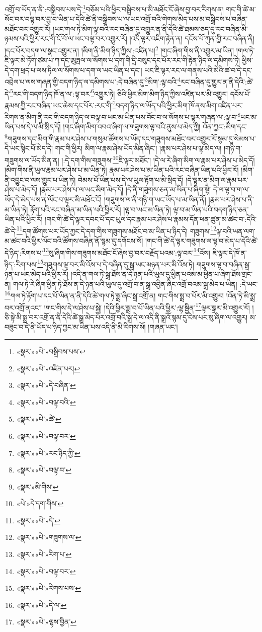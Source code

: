 འགྲོ་བ་ཡོད་ན་ནི་:བསྒྲིབས་པས་དེ་\footnote{«སྣར་»«པེ་»བསྒྲིབས་པས་}བཅོམ་པའི་ཕྱིར་བསྒྲིབས་པ་མི་མཐོང་ངོ་ཞེས་བྱ་བར་རིགས་ན། གང་གི་ཚེ་མ་སོང་བར་བལྟ་བར་བྱ་བ་ཡིན་པ་དེའི་ཚེ་ནི་བསྒྲིབས་པ་ལ་ཡང་འགྲོ་བའི་གེགས་མེད་པས་མ་བསྒྲིབས་པ་བཞིན་མཐོང་བར་འགྱུར་རོ། །ཡང་གལ་ཏེ་མིག་ལྟ་བའི་རང་བཞིན་དུ་འགྱུར་ན་ནི་དེའི་ཚེ་ཐམས་ཅད་དུ་རང་བཞིན་མི་ཉམས་པའི་ཕྱིར་རང་གི་ངོ་བོ་ལ་ཡང་བལྟ་བར་འགྱུར་རོ། །འདི་ལྟར་འཇིག་རྟེན་ན། དངོས་པོ་ཀུན་གྱི་རང་བཞིན་ནི། །དང་པོར་བདག་ལ་སྣང་འགྱུར་ན། །མིག་ནི་མིག་ཉིད་ཀྱིས་:འཛིན་པ།\footnote{«སྣར་»«པེ་»འཛིན་པར།} །གང་ཞིག་གིས་ནི་འགྱུར་མ་ཡིན། །གལ་ཏེ་ཇི་ལྟར་མེ་ཏོག་ཙམ་པ་ཀ་དང་ཨུཏྤལ་ལ་སོགས་པ་དག་གི་དྲི་བསུང་དང་པོར་རང་གི་རྟེན་ཉིད་ལ་དམིགས་ཏེ། ཕྱིས་དེ་དག་ཕྲད་པ་ལས་ཏིལ་ལ་སོགས་པ་དག་ལ་ཡང་ཡིན་པ་དང་། ཡང་ཇི་ལྟར་རང་ལ་གནས་པའི་མེའི་ཚ་བ་དེ་དང་འབྲེལ་པ་ལས་གཞན་གྱི་བདག་ཉིད་ལ་དམིགས་པ་:དེ་བཞིན་དུ་\footnote{«སྣར་»«པེ་»དེ་བཞིན་}མིག་:ལྟ་བའི་\footnote{«སྣར་»«པེ་»བལྟ་བའི་}རང་བཞིན་དུ་གྱུར་ན་ནི་དེའི་:ཚེ་དེ་\footnote{«སྣར་»«པེ་»ཚེ་}རང་གི་བདག་ཉིད་ཁོ་ན་ལ་:ལྟ་བར་\footnote{«སྣར་»«པེ་»བལྟ་བར་}འགྱུར་ཏེ། ཅིའི་ཕྱིར་མིག་མིག་ཉིད་ཀྱིས་འཛིན་པར་མི་འགྱུར། དངོས་པོ་རྣམས་ཀྱི་རང་བཞིན་ཡང་ཆེས་དང་པོར་:རང་གི་\footnote{«སྣར་»«པེ་»རང་ཉིད་ཀྱི་}བདག་ཉིད་ལ་ཡོད་པའི་ཕྱིར་མིག་ཁོ་ནས་མིག་འཛིན་པར་རིགས་ན་མིག་ནི་རང་གི་བདག་ཉིད་ལ་བལྟ་བ་ཡང་མ་ཡིན་པས་བོང་བ་ལ་སོགས་པ་ལྟར་གཞན་ལ་:ལྟ་བ་\footnote{«སྣར་»«པེ་»བལྟ་བ་}ཡང་མ་ཡིན་པས་དེ་ལ་མི་སྲིད་དོ། །གང་ཞིག་མིག་འབའ་ཞིག་ལ་གཟུགས་ལྟ་བའི་ནུས་པ་མེད་ཀྱི། འོན་ཀྱང་:མིག་དང་\footnote{«སྣར་»མི་གིས་}གཟུགས་དང་མིག་གི་རྣམ་པར་ཤེས་པ་གསུམ་ཚོགས་པ་ཡོད་དང་གཟུགས་མཐོང་བར་འགྱུར་རོ་སྙམ་དུ་སེམས་པ་དེ་ཡང་སྙིང་པོ་མེད་དེ། གང་གི་ཕྱིར། མིག་ལ་རྣམ་ཤེས་ཡོད་མིན་ཞིང་། །རྣམ་པར་ཤེས་པ་ལྟ་མེད་ལ། །གཉི་ག་གཟུགས་ལ་ཡོད་མིན་ན། །:དེ་དག་གིས་གཟུགས་\footnote{«པེ་»དེ་དག་གིས་}ཇི་ལྟར་མཐོང་། །དེ་ལ་རེ་ཞིག་མིག་ལ་རྣམ་པར་ཤེས་པ་མེད་དོ། །མིག་གིས་ནི་ཡུལ་རྣམ་པར་ཤེས་པ་མ་ཡིན་ཏེ། རྣམ་པར་ཤེས་པ་མ་ཡིན་པའི་རང་བཞིན་ཡིན་པའི་ཕྱིར་རོ། །མིག་ནི་འབྱུང་བ་ལས་གྱུར་པ་ཡིན་ཏེ། བེམས་པོ་ཡིན་པས་དེ་ལ་ཡུལ་རྟོག་པ་མི་སྲིད་དོ། །དེ་ལྟར་ན་མིག་ལ་རྣམ་པར་ཤེས་པ་མེད་དོ། །རྣམ་པར་ཤེས་པ་ལ་ཡང་མིག་མེད་དོ། །དེ་ནི་གཟུགས་ཅན་མ་ཡིན་པ་ཞིག་སྟེ། དེ་ལ་ལྟ་བ་ག་ལ་ཡོད་དེ་མེད་པས་ན་ལོང་བ་ལྟར་མི་མཐོང་ངོ། །གཟུགས་ལ་ནི་གཉི་ག་ཡང་ཡོད་པ་མ་ཡིན་ནོ། །རྣམ་པར་ཤེས་པ་ནི་མ་ཡིན་ཏེ། རྟོག་པའི་རང་བཞིན་མ་ཡིན་པའི་ཕྱིར་རོ། །ལྟ་བ་ཡང་མ་ཡིན་ཏེ། ལྟ་བ་མ་ཡིན་པའི་བདག་ཉིད་ཅན་ཡིན་པའི་ཕྱིར་རོ། །གང་གི་ཚེ་དེ་ལྟར་དབང་པོ་དང་ཡུལ་དང་རྣམ་པར་ཤེས་པ་རྣམས་དོན་ཕན་ཚུན་མ་ཚང་བ་:དེའི་ཚེ་དེ་\footnote{«སྣར་»«པེ་»དེ་}དག་ཚོགས་པར་ཡོད་ཀྱང་དེ་དག་གིས་གཟུགས་མཐོང་བ་མ་ཡིན་པ་ཉིད་དེ། གཟུགས་\footnote{«སྣར་»«པེ་»གཟུགས་ལ་}ལྟ་བའི་ཡན་ལག་མ་ཚང་བའི་ཕྱིར་ལོང་བའི་ཚོགས་བཞིན་ནོ་སྙམ་དུ་དགོངས་སོ། །གང་གི་ཚེ་དེ་ལྟར་གཟུགས་ལ་ལྟ་བ་མེད་པ་དེའི་ཚེ་དེ་ཉིད་:རིགས་པ་\footnote{«སྣར་»«པེ་»རིག་པ་}སུ་ཞིག་གིས་གཟུགས་མཐོང་ངོ་ཞེས་བྱ་བར་བརྗོད་པའམ་:ལྟ་བར་\footnote{«སྣར་»«པེ་»བལྟ་བར་}འོས། ཇི་ལྟར་དེ་ཁོ་ན་ཉིད་:རིག་པས་\footnote{«སྣར་»«པེ་»རིགས་པས་}གཟུགས་ལྟ་བར་མི་འོས་པ་དེ་བཞིན་དུ་སྒྲ་ཡང་མཉན་པར་མི་འོས་ཏེ། གཟུགས་ལྟ་བ་བཞིན་སྒྲ་ཉན་པ་ཡང་མེད་པའི་ཕྱིར་རོ། །འདི་ན་གལ་ཏེ་སྒྲ་ཐོས་ན་དེ་ཉན་པའི་ཡུལ་དུ་ཕྱིན་པའམ་མ་ཕྱིན་པ་ཞིག་ཐོས་གྲང་ན། གལ་ཏེ་རེ་ཞིག་ཕྱིན་ཏེ་ཐོས་ན་དེ་ཉན་པའི་ཡུལ་དུ་འགྲོ་བ་ན་སྒྲ་འབྱིན་ཞིང་འགྲོ་བའམ་སྒྲ་མེད་པ་ཡིན། :དེ་ཡང་\footnote{«སྣར་»«པེ་»དེ་ལ་}གལ་ཏེ་རྟོག་པ་དང་པོ་ཡིན་ན་ནི་དེའི་ཚེ་གལ་ཏེ་སྨྲ་ཞིང་སྒྲ་འགྲོ་ན། གང་གིས་སྨྲ་བ་པོར་མི་འགྱུར། །འོན་ཏེ་མི་སྨྲ་བར་འགྲོ་ནའང་། །གང་གིས་དེ་ལ་ཤེས་པ་སྐྱེ། །དེའི་ཕྱིར་སྨྲ་བ་པོ་ཡིན་པའི་ཕྱིར་:ལྷ་སྦྱིན་\footnote{«སྣར་»«པེ་»ལྷས་བྱིན་}ལྟར་སྒྲར་མི་འགྱུར་རོ། །ཅི་སྟེ་མི་སྨྲ་བར་འགྲོ་ན་ནི་དེའི་ཚེ་སྒྲ་མེད་པར་འགྲོ་བའི་སྒྲ་དེ་ལ་འདི་ནི་སྒྲའོ་སྙམ་དུ་ངེས་པར་སུ་ཞིག་ལ་འགྱུར། མ་བཟུང་བ་དེ་ནི་ཡོད་པ་ཉིད་ཀྱང་མ་ཡིན་པས་འདི་ནི་མི་རིགས་སོ། །གཞན་ཡང་། 